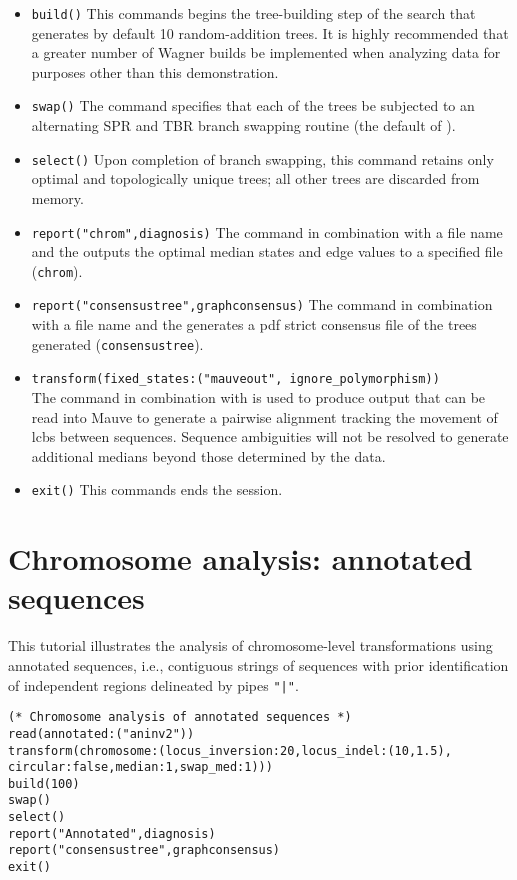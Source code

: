 \begin{itemize}
\item \texttt{build()} This commands begins the tree-building step of the search that generates by default 10 random-addition trees. It is highly recommended that a greater number of Wagner builds be implemented when analyzing data for purposes other than this demonstration.
\item \texttt{swap()} The  command specifies that each of the trees be subjected to an alternating SPR and TBR branch swapping routine (the default of \poy).
\item \texttt{select()} Upon completion of branch swapping, this command retains only optimal and topologically unique trees; all other trees are discarded from memory. 
\item \texttt{report("chrom",diagnosis)}  The  command in combination with a file name and the  outputs the optimal median states and edge values to a specified file (\texttt{chrom}). 
\item \texttt{report("consensustree",graphconsensus)}  The  command in combination with a file name and the  generates a pdf strict consensus file of the trees generated (\texttt{consensustree}). 
\item \texttt{transform(fixed\_states:("mauveout", ignore\_polymorphism))}  \\The {} command in combination with  is used to produce output that can be read into Mauve to generate a pairwise alignment tracking the movement of lcbs between sequences. Sequence ambiguities will not be resolved to generate additional medians beyond those determined by the data.
\item \texttt{exit()} This commands ends the \poy session.
\end{itemize}

\section{Chromosome analysis: annotated sequences}{\label{tutorial 7}}

This tutorial illustrates the analysis of chromosome-level transformations using 
annotated sequences, i.e., contiguous strings of sequences with prior 
identification of independent regions delineated by pipes  \texttt{"|"}. 

\begin{verbatim}
(* Chromosome analysis of annotated sequences *)
read(annotated:("aninv2"))
transform(chromosome:(locus_inversion:20,locus_indel:(10,1.5),
circular:false,median:1,swap_med:1)))
build(100)
swap()
select()
report("Annotated",diagnosis)
report("consensustree",graphconsensus)
exit()
\end{verbatim}

